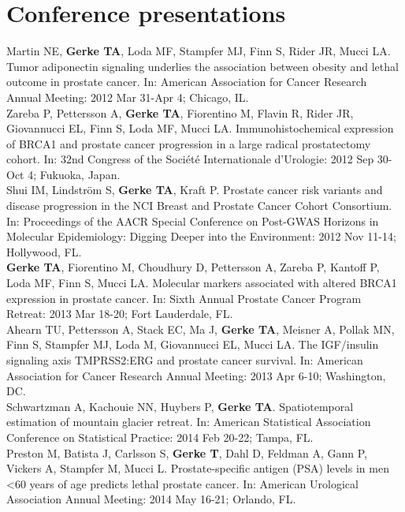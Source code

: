 \documentclass[11pt, a4paper]{article} %
\begin{document}
\section*{Conference presentations}
Martin NE, {\bf Gerke TA}, Loda MF, Stampfer MJ, Finn S, Rider JR, Mucci LA. Tumor adiponectin signaling underlies the association between obesity and lethal outcome in prostate cancer. In: American Association for Cancer Research Annual Meeting: 2012 Mar 31-Apr 4; Chicago, IL.\\

Zareba P, Pettersson A, {\bf Gerke TA}, Fiorentino M, Flavin R, Rider JR, Giovannucci EL, Finn S, Loda MF, Mucci LA. Immunohistochemical expression of BRCA1 and prostate cancer progression in  a large radical prostatectomy cohort. In: 32nd Congress of the Soci\'{e}t\'{e} Internationale d'Urologie: 2012 Sep 30-Oct 4; Fukuoka, Japan.\\

Shui IM, Lindstr\"{o}m S, {\bf Gerke TA}, Kraft P. Prostate cancer risk variants and disease progression in the NCI Breast and Prostate Cancer Cohort Consortium. In: Proceedings of the AACR Special Conference on Post-GWAS Horizons in Molecular Epidemiology: Digging Deeper into the Environment: 2012 Nov 11-14; Hollywood, FL.\\

{\bf Gerke TA}, Fiorentino M, Choudhury D, Pettersson A, Zareba P, Kantoff P, Loda MF, Finn S, Mucci LA. Molecular markers associated with altered BRCA1 expression in prostate cancer. In: Sixth Annual Prostate Cancer Program Retreat: 2013 Mar 18-20; Fort Lauderdale, FL.\\

Ahearn TU, Pettersson A, Stack EC, Ma J, {\bf Gerke TA}, Meisner A, Pollak MN, Finn S, Stampfer MJ, Loda M, Giovannucci EL, Mucci LA.  The IGF/insulin signaling axis TMPRSS2:ERG and prostate cancer survival.  In: American Association for Cancer Research Annual Meeting: 2013 Apr 6-10; Washington, DC.\\

Schwartzman A, Kachouie NN, Huybers P, {\bf Gerke TA}. Spatiotemporal estimation of mountain glacier retreat. In: American Statistical Association Conference on Statistical Practice: 2014 Feb 20-22; Tampa, FL.\\

Preston M, Batista J, Carlsson S, {\bf Gerke T}, Dahl D, Feldman A, Gann P, Vickers A, Stampfer M, Mucci L. Prostate-specific antigen (PSA) levels in men <60 years of age predicts lethal prostate cancer. In: American Urological Association Annual Meeting: 2014 May 16-21; Orlando, FL.\\
\end{document}
